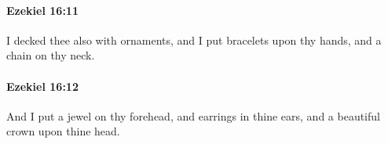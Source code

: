 		\paragraph{Ezekiel 16:11} %
			\label{EZEKIEL-16-11}

			I decked thee also with ornaments, and I put bracelets upon thy hands, and a chain on thy neck.


		\paragraph{Ezekiel 16:12} %
			\label{EZEKIEL-16-12}

			And I put a jewel on thy forehead, and earrings in thine ears, and a beautiful crown upon thine head.


